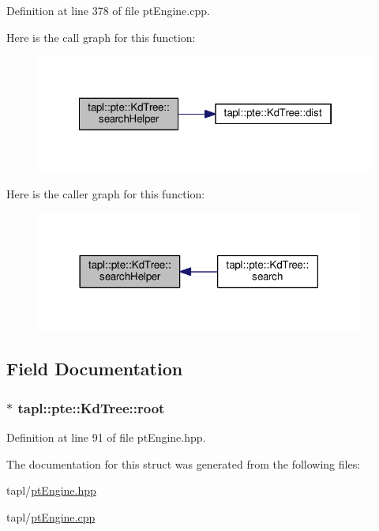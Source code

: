 Definition at line 378 of file pt\+Engine.\+cpp.



Here is the call graph for this function\+:\nopagebreak
\begin{figure}[H]
\begin{center}
\leavevmode
\includegraphics[width=322pt]{structtapl_1_1pte_1_1KdTree_a8add21f54b1f0ee01746582073e9fac5_cgraph}
\end{center}
\end{figure}




Here is the caller graph for this function\+:\nopagebreak
\begin{figure}[H]
\begin{center}
\leavevmode
\includegraphics[width=306pt]{structtapl_1_1pte_1_1KdTree_a8add21f54b1f0ee01746582073e9fac5_icgraph}
\end{center}
\end{figure}




\subsection{Field Documentation}
\subsubsection[{\texorpdfstring{root}{root}}]{$\ast$ tapl\+::pte\+::\+Kd\+Tree\+::root}\hypertarget{structtapl_1_1pte_1_1KdTree_a5dd05133b3a9429ae973eda1806c05e7}{}\label{structtapl_1_1pte_1_1KdTree_a5dd05133b3a9429ae973eda1806c05e7}


Definition at line 91 of file pt\+Engine.\+hpp.



The documentation for this struct was generated from the following files\+:\begin{DoxyCompactItemize}
\item 
tapl/\hyperlink{ptEngine_8hpp}{pt\+Engine.\+hpp}\item 
tapl/\hyperlink{ptEngine_8cpp}{pt\+Engine.\+cpp}\end{DoxyCompactItemize}
